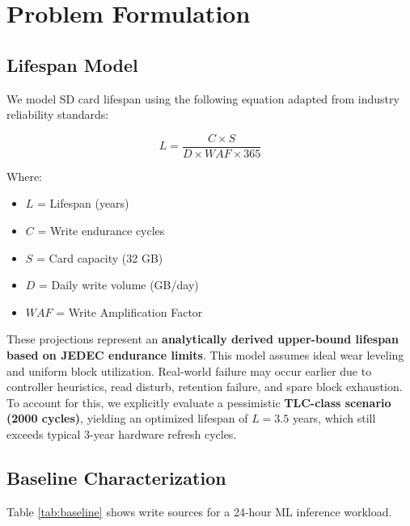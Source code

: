 \documentclass[conference]{IEEEtran}
\begin{document}
\section{Problem Formulation}

\subsection{Lifespan Model}

We model SD card lifespan using the following equation adapted from industry reliability standards:

\begin{equation}
L = \frac{C \times S}{D \times WAF \times 365}
\label{eq:lifespan}
\end{equation}

Where:
\begin{itemize}
    \item $L$ = Lifespan (years)
    \item $C$ = Write endurance cycles
    \item $S$ = Card capacity (32 GB)
    \item $D$ = Daily write volume (GB/day)
    \item $WAF$ = Write Amplification Factor
\end{itemize}

These projections represent an \textbf{analytically derived upper-bound lifespan based on JEDEC endurance limits}. This model assumes ideal wear leveling and uniform block utilization. Real-world failure may occur earlier due to controller heuristics, read disturb, retention failure, and spare block exhaustion. To account for this, we explicitly evaluate a pessimistic \textbf{TLC-class scenario (2000 cycles)}, yielding an optimized lifespan of $L = 3.5$ years, which still exceeds typical 3-year hardware refresh cycles.

\subsection{Baseline Characterization}

Table \ref{tab:baseline} shows write sources for a 24-hour ML inference workload.
\end{document}
